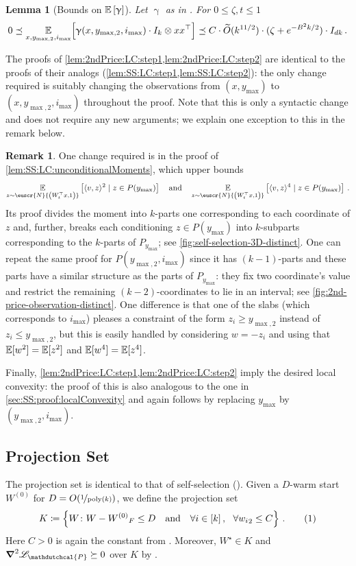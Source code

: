 \documentclass[11pt,letterpaper]{article}
\theoremstyle{plain}
\newtheorem{lemma}[theorem]{Lemma}
\theoremstyle{definition}
\newtheorem{remark}[theorem]{Remark}
\theoremstyle{remark}
\newcommand{\yesnum}{\addtocounter{equation}{1}\tag{\theequation}}
\newcommand{\quadtext}[1]{\quad\text{#1}\quad}
\newcommand{\quadand}{\quadtext{and}}
\newcommand{\inbrace}[1]{\ensuremath{\left\{#1\right\}}}
\newcommand{\sinangle}[1]{\ensuremath{\langle#1\rangle}}
\newcommand{\inparen}[1]{\ensuremath{\left(#1\right)}}
\newcommand{\insquare}[1]{\ensuremath{\left[#1\right]}}
\let\norm\relax
\newcommand{\norm}[1]{\ensuremath{\left\lVert #1 \right\rVert}}
\newcommand{\E}{\operatornamewithlimits{\mathbb{E}}}
\newcommand{\Ex}{\E}
\newcommand{\nfrac}[2]{\nicefrac{#1}{#2}}
\newcommand{\poly}{\mathrm{poly}}
\newcommand{\wt}[1]{\widetilde{#1}}
\newcommand{\customcal}[1]{\euscr{#1}}
\newcommand{\cN}{\customcal{N}}
\renewcommand{\gamma}{\upgamma}
\newcommand{\negLL}{\ensuremath{\mathscr{L}}}
\newcommand{\hypo}[1]{\mathdutchcal{#1}}
\newcommand{\hyP}{\hypo{P}}
\newcommand{\normal}[2]{\cN{\inparen{#1,#2}}}
\newcommand{\ymax}{y_{\max}}
\newcommand{\smax}{\max,2} %
\newcommand{\imax}{i_{\max}}
\newcommand{\ysmax}{y_{\smax}}
\begin{document}
{{    \begin{lemma}[Bounds on $\Ex\insquare{\gamma}$]\label{lem:2ndPrice:LC:step2}
        Let $\gamma$ as in .
        For $0\leq \zeta,t\leq 1$ 
        \[
            0\preceq \Ex_{x,\ysmax,\imax}\Bigl[\gamma(x,\ysmax,\imax) \cdot I_{k}\otimes xx^\top \Bigr] \preceq 
            C
                \cdot \wt{O}(k^{11/2})
                \cdot (\zeta + e^{-B^2 k/2})
                \cdot I_{dk}\,.
        \]
    \end{lemma}
    The proofs of \cref{lem:2ndPrice:LC:step1,lem:2ndPrice:LC:step2} are identical to the proofs of their analogs (\cref{lem:SS:LC:step1,lem:SS:LC:step2}): the only change required is suitably changing the observations from $(x,\ymax)$ to $(x,\ysmax,\imax)$ throughout the proof.
    Note that this is only a syntactic change and does not require any new arguments; we explain one exception to this in the remark below.
    \begin{remark}
        One change required is in the proof of \cref{lem:SS:LC:unconditionalMoments}, which upper bounds 
        \[
            \Ex_{z\sim \normal{W_t^\top x}{1}}\insquare{\sinangle{v,z}^2\mid z\in P(\ymax)}
            \quadand
            \Ex_{z\sim \normal{W_t^\top x}{1}}\insquare{\sinangle{v,z}^4\mid z\in P(\ymax)}\,.
        \]
        Its proof divides the moment into $k$-parts one corresponding to each coordinate of $z$ and, further, breaks each conditioning $z\in P(\ymax)$ into $k$-subparts corresponding to the $k$-parts of $P_{\ymax}$; see \cref{fig:self-selection-3D-distinct}. 
        One can repeat the same proof for $P(\ysmax,\imax)$ since it has $(k-1)$-parts and these parts have a similar structure as the parts of $P_{\ymax}$: they fix two coordinate's value and restrict the remaining $(k-2)$-coordinates to lie in an interval; see \cref{fig:2nd-price-observation-distinct}. 
        One difference is that one of the slabs (which corresponds to $\imax$) pleases a constraint of the form $z_i\geq \ysmax$ instead of $z_i\leq \ysmax$, but this is easily handled by considering $w=-z_i$ and using that $\Ex[w^2]=\Ex[z^2]$ and $\Ex[w^4]=\Ex[z^4]$.
    \end{remark}
    Finally, \cref{lem:2ndPrice:LC:step1,lem:2ndPrice:LC:step2} imply the desired local convexity: the proof of this is also analogous to the one in \cref{sec:SS:proof:localConvexity} and again follows by replacing $\ymax$ by $(\ysmax,\imax)$.

\subsection{Projection Set}
The projection set is identical to that of self-selection ().
Given a $D$-warm start $W^{(0)}$ for $D = O(\nfrac1{\poly(k)})$,
we define the projection set
\[
    K\coloneqq \inbrace{W\colon \norm{W-W^{(0)}}_F\leq D
        \quadand
        \forall i\in [k]\,,~~ \forall \norm{w_i}_2\leq C}\,.
    \yesnum\label{eq:2ndPrice:projectionSet}
\]
Here $C>0$ is again the constant from .
Moreover, $W^\star\in K$ and $\grad^2\negLL_\hyP \succeq 0$ over $K$ by .

}}
\end{document}

